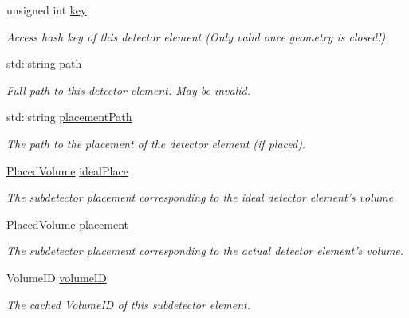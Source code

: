 \begin{DoxyCompactItemize}
unsigned int \hyperlink{class_d_d4hep_1_1_geometry_1_1_det_element_object_a77994e3dcc6416eadd3be577c46a8e29}{key}
\begin{DoxyCompactList}\small\item\em Access hash key of this detector element (Only valid once geometry is closed!). \item\end{DoxyCompactList}\item 
std::string \hyperlink{class_d_d4hep_1_1_geometry_1_1_det_element_object_a6346cce7b6b1f96a5f33a41f2f9e219f}{path}
\begin{DoxyCompactList}\small\item\em Full path to this detector element. May be invalid. \item\end{DoxyCompactList}\item 
std::string \hyperlink{class_d_d4hep_1_1_geometry_1_1_det_element_object_a64bf695379c82abca8e8054307a94861}{placementPath}
\begin{DoxyCompactList}\small\item\em The path to the placement of the detector element (if placed). \item\end{DoxyCompactList}\item 
\hyperlink{class_d_d4hep_1_1_geometry_1_1_placed_volume}{PlacedVolume} \hyperlink{class_d_d4hep_1_1_geometry_1_1_det_element_object_a343542db3151374647357978d11b9b68}{idealPlace}
\begin{DoxyCompactList}\small\item\em The subdetector placement corresponding to the ideal detector element's volume. \item\end{DoxyCompactList}\item 
\hyperlink{class_d_d4hep_1_1_geometry_1_1_placed_volume}{PlacedVolume} \hyperlink{class_d_d4hep_1_1_geometry_1_1_det_element_object_a7ee03e0b36f123f1ae48fda184303c2a}{placement}
\begin{DoxyCompactList}\small\item\em The subdetector placement corresponding to the actual detector element's volume. \item\end{DoxyCompactList}\item 
VolumeID \hyperlink{class_d_d4hep_1_1_geometry_1_1_det_element_object_a276f203e5b02da612f42450767bf9756}{volumeID}
\begin{DoxyCompactList}\small\item\em The cached VolumeID of this subdetector element. \item\end{DoxyCompactList}\item 

\end{DoxyCompactItemize}

